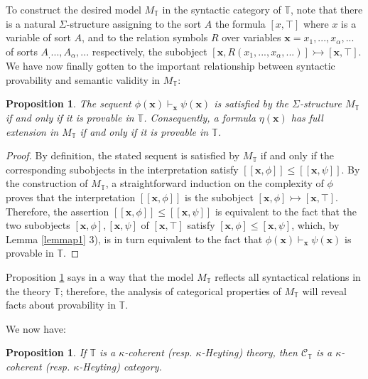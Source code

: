 \documentclass[a4paper,11pt]{article}
\theoremstyle{plain}
\newtheorem{proposition}[thm]{Proposition}
\theoremstyle{plain}
\theoremstyle{remark}
\newcommand{\theory}{\ensuremath{\mathbb{T}}}
\begin{document}
To construct the desired model $M_{\theory}$ in the syntactic category of $\theory$, note that there is a natural $\Sigma$-structure assigning to the sort $A$ the formula $[x, \top]$ where $x$ is a variable of sort $A$, and to the relation symbols $R$ over variables $\mathbf{x}=x_1, ..., x_{\alpha}, ...$ of sorts $A_, ..., A_{\alpha}, ...$ respectively, the subobject $[\mathbf{x}, R(x_1, ..., x_{\alpha}, ...)] \rightarrowtail [\mathbf{x}, \top]$. We have now finally gotten to the important relationship between syntactic provability and semantic validity in $M_{\theory}$:

\begin{proposition}\label{thmp2} The sequent $\phi(\mathbf{x}) \vdash_{\mathbf{x}} \psi(\mathbf{x})$ is satisfied by the $\Sigma$-structure $M_{\theory}$ if and only if it is provable in $\theory$. Consequently, a formula $\eta(\mathbf{x})$ has full extension in $M_{\theory}$ if and only if it is provable in $\theory$.
\end{proposition}


\begin{proof} By definition, the stated sequent is satisfied by $M_{\theory}$ if and only if the corresponding subobjects in the interpretation satisfy $[\![\mathbf{x}, \phi]\!] \leq [\![\mathbf{x}, \psi]\!]$. By the construction of $M_{\theory}$, a straightforward induction on the complexity of $\phi$ proves that the interpretation $[\![\mathbf{x}, \phi]\!]$ is the subobject $[\mathbf{x}, \phi] \rightarrowtail [\mathbf{x}, \top]$. Therefore, the assertion $[\![\mathbf{x}, \phi]\!] \leq [\![\mathbf{x}, \psi]\!]$ is equivalent to the fact that the two subobjects $[\mathbf{x}, \phi], [\mathbf{x}, \psi]$ of $[\mathbf{x}, \top]$ satisfy $[\mathbf{x}, \phi] \leq [\mathbf{x}, \psi]$, which, by Lemma \ref{lemmap1} 3), is in turn equivalent to the fact that $\phi(\mathbf{x}) \vdash_{\mathbf{x}} \psi(\mathbf{x})$ is provable in $\theory$.\end{proof}

Proposition \ref{thmp2} says in a way that the model $M_{\theory}$ reflects all syntactical relations in the theory $\theory$; therefore, the analysis of categorical properties of $M_{\theory}$ will reveal facts about provability in $\theory$. 

We now have:

\begin{proposition}\label{catcomp}
 If $\theory$ is a $\kappa$-coherent (resp. $\kappa$-Heyting) theory, then $\mathcal{C}_{\theory}$ is a $\kappa$-coherent (resp. $\kappa$-Heyting) category.
\end{proposition}
\end{document}
